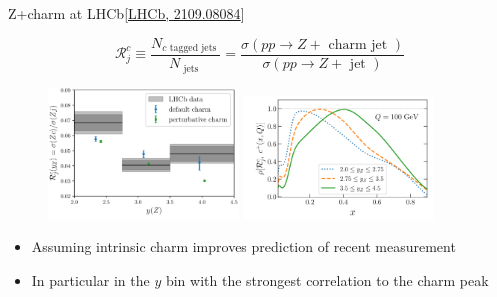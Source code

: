 \documentclass[aspectratio=43, 8pt,t]{beamer}
\begin{document}
\begin{frame}{Z+charm at LHCb}{\color{gray}\footnotesize [\hyperlink{https://arxiv.org/abs/2109.08084}{LHCb, 2109.08084}]}

  \begin{equation*}
    \mathcal{R}_j^c \equiv \frac{N_{c \text { tagged jets }}}{N_\text { jets }  }=\frac{\sigma\left(p p \rightarrow Z+\text { charm jet } \right)}{\sigma\left(p p \rightarrow Z+\text { jet }  \right)}
  \end{equation*}
  \begin{figure}
    \includegraphics[width=0.45\textwidth]{lhcb_data.png}
    \includegraphics[width=0.45\textwidth]{charm_Rjet_corr.png}
  \end{figure}
  \begin{itemize}
    \item Assuming intrinsic charm improves prediction of recent measurement
    \item In particular in the $y$ bin with the strongest correlation to the charm peak
  \end{itemize}
\end{frame}
\end{document}
